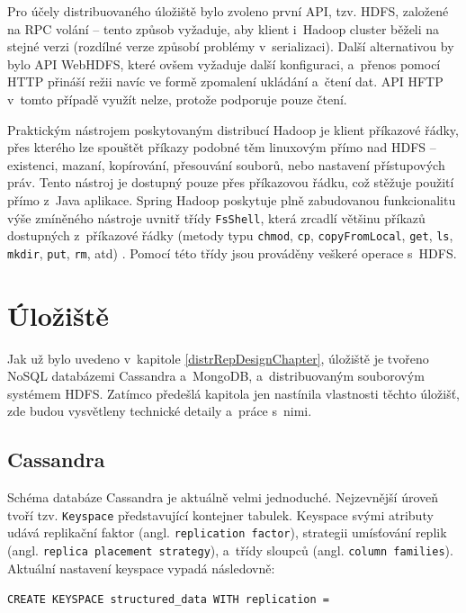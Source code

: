 \noindent Pro účely distribuovaného úložiště bylo zvoleno první API, tzv. HDFS, založené na RPC volání -- tento způsob vyžaduje, aby klient i~Hadoop cluster běželi na stejné verzi (rozdílné verze způsobí problémy v~serializaci). Další alternativou by bylo API WebHDFS, které ovšem vyžaduje další konfiguraci, a~přenos pomocí HTTP přináší režii navíc ve formě zpomalení ukládání a~čtení dat.
API HFTP v~tomto případě využít nelze, protože podporuje pouze čtení.

Praktickým nástrojem poskytovaným distribucí Hadoop je klient příkazové řádky, přes kterého lze spouštět příkazy podobné těm linuxovým přímo nad HDFS -- existenci, mazaní, kopírování, přesouvání souborů, nebo nastavení přístupových práv. Tento nástroj je dostupný pouze přes příkazovou řádku, což stěžuje použití přímo z~Java aplikace. Spring Hadoop poskytuje plně zabudovanou funkcionalitu výše zmíněného nástroje uvnitř třídy \texttt{FsShell}, která zrcadlí většinu příkazů dostupných z~příkazové řádky (metody typu \texttt{chmod}, \texttt{cp}, \texttt{copyFromLocal}, \texttt{get}, \texttt{ls}, \texttt{mkdir}, \texttt{put}, \texttt{rm}, atd) \cite{springHadoopReference}. Pomocí této třídy jsou prováděny veškeré operace s~HDFS.

\section{Úložiště}
Jak už bylo uvedeno v~kapitole \ref{distrRepDesignChapter}, úložiště je tvořeno NoSQL databázemi Cassandra a~MongoDB, a~distribuovaným souborovým systémem HDFS. Zatímco předešlá kapitola jen nastínila vlastnosti těchto úložišť, zde budou vysvětleny technické detaily a~práce s~nimi.

\subsection{Cassandra} \label{cassandra}
Schéma databáze Cassandra je aktuálně velmi jednoduché. Nejzevnější úroveň tvoří tzv. \texttt{Keyspace} představující kontejner tabulek. Keyspace svými atributy udává replikační faktor (angl. \texttt{replication factor}), strategii umísťování replik (angl. \texttt{replica placement strategy}), a~třídy sloupců (angl. \texttt{column families}). Aktuální nastavení keyspace vypadá následovně:

\vspace{0.5cm}
\texttt{CREATE KEYSPACE structured\_data WITH replication = }

\texttt{ }

